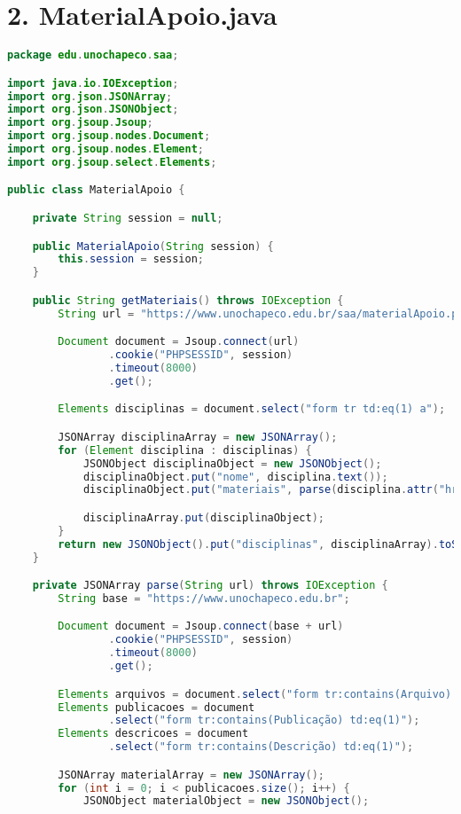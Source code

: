 \section*{2. MaterialApoio.java}
\begin{lstlisting}[language=java, frame=single]
package edu.unochapeco.saa;

import java.io.IOException;
import org.json.JSONArray;
import org.json.JSONObject;
import org.jsoup.Jsoup;
import org.jsoup.nodes.Document;
import org.jsoup.nodes.Element;
import org.jsoup.select.Elements;

public class MaterialApoio {

    private String session = null;

    public MaterialApoio(String session) {
        this.session = session;
    }

    public String getMateriais() throws IOException {
        String url = "https://www.unochapeco.edu.br/saa/materialApoio.php";

        Document document = Jsoup.connect(url)
                .cookie("PHPSESSID", session)
                .timeout(8000)
                .get();

        Elements disciplinas = document.select("form tr td:eq(1) a");

        JSONArray disciplinaArray = new JSONArray();
        for (Element disciplina : disciplinas) {
            JSONObject disciplinaObject = new JSONObject();
            disciplinaObject.put("nome", disciplina.text());
            disciplinaObject.put("materiais", parse(disciplina.attr("href")));

            disciplinaArray.put(disciplinaObject);
        }
        return new JSONObject().put("disciplinas", disciplinaArray).toString();
    }

    private JSONArray parse(String url) throws IOException {
        String base = "https://www.unochapeco.edu.br";

        Document document = Jsoup.connect(base + url)
                .cookie("PHPSESSID", session)
                .timeout(8000)
                .get();

        Elements arquivos = document.select("form tr:contains(Arquivo) a");
        Elements publicacoes = document
                .select("form tr:contains(Publicação) td:eq(1)");
        Elements descricoes = document
                .select("form tr:contains(Descrição) td:eq(1)");

        JSONArray materialArray = new JSONArray();
        for (int i = 0; i < publicacoes.size(); i++) {
            JSONObject materialObject = new JSONObject();


\end{lstlisting}
